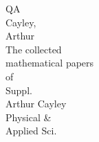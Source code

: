 \documentclass[11pt,a4paper]{article}
\begin{document}
\clearpage
\thispagestyle{empty}
\begin{center}
\vspace*{\fill}
\begin{minipage}{0.6\textwidth}
\centering
\small
\textsc{QA}\\[0.5em]
Cayley,\\
Arthur\\[0.5em]
The collected\\
mathematical papers\\
of\\[0.5em]
Suppl.\\
Arthur Cayley\\[1em]
Physical \&\\
Applied Sci.\\[2em]
\end{minipage}
\vspace*{\fill}
\end{center}

\clearpage
\thispagestyle{empty}
\null  %
\end{document}
